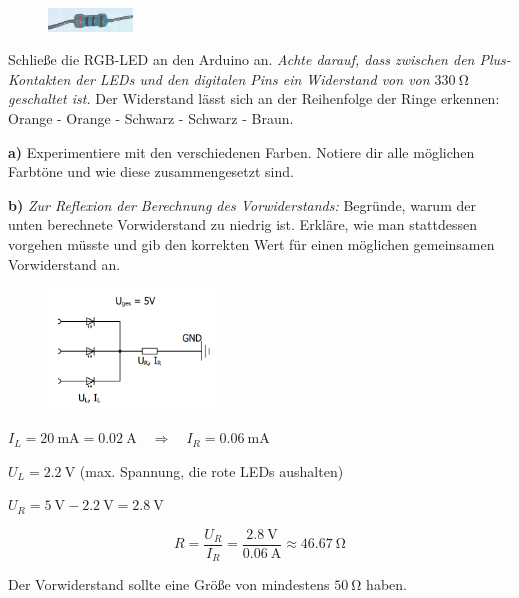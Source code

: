 \begin{projekt}
	\begin{figure}
		\centering
		\includegraphics[angle=90,width=0.2\textwidth]{pics/330ohm.jpg}
	\end{figure}
	Schließe die RGB-LED an den Arduino an. \emph{Achte darauf, dass zwischen den Plus-Kontakten der LEDs und den digitalen Pins ein Widerstand von von $\SI{330}{\ohm}$ geschaltet ist.} Der Widerstand lässt sich an der Reihenfolge der Ringe erkennen: Orange - Orange - Schwarz - Schwarz - Braun.
	
	\medbreak
	\textbf{a)} Experimentiere mit den verschiedenen Farben. Notiere dir alle möglichen Farbtöne und wie diese zusammengesetzt sind.
		
	\medskip
	\textbf{b)} \emph{Zur Reflexion der Berechnung des Vorwiderstands:} Begründe, warum der unten berechnete Vorwiderstand zu niedrig ist. Erkläre, wie man stattdessen vorgehen müsste und gib den korrekten Wert für einen möglichen gemeinsamen Vorwiderstand an.
\end{projekt}

\vspace{2\baselineskip}
\begin{tcolorbox}
	\begin{figure}
		\centering
		\vspace{-\baselineskip}
		\includegraphics[width=0.4\textwidth]{./Zeichnungen/schaltplan-rgb-led-berechnung.png}
	\end{figure}
	$I_L = \SI{20}{\milli\ampere} = \SI{0,02}{\ampere} \quad \Longrightarrow \quad I_R = \SI{0,06}{\milli\ampere}$
	
	$U_L = \SI{2,2}{\volt}$ \quad (max. Spannung, die rote LEDs aushalten)
	
	$U_R = \SI{5}{\volt} - \SI{2,2}{\volt} = \SI{2,8}{\volt}$
	
	\begin{equation*}
		R = \frac{U_R}{I_R} = \frac{\SI{2,8}{\volt}}{\SI{0,06}{\ampere}} \approx \SI{46,67}{\ohm}
	\end{equation*}
	
	\bigskip
	Der Vorwiderstand sollte eine Größe von mindestens $\SI{50}{\ohm}$ haben.
\end{tcolorbox}

